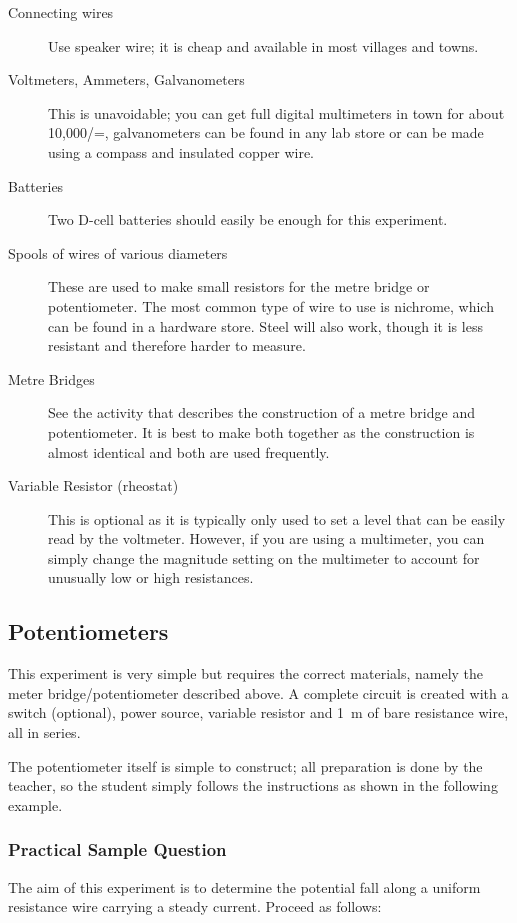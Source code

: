 \begin{description}
\item[Connecting wires]{Use speaker wire; it is cheap and available in most villages
and towns.}
\item[Voltmeters, Ammeters, Galvanometers]{This is unavoidable; you can get full
digital multimeters in town for about 10,000/=, galvanometers can be found in
any lab store or can be made using a compass and insulated copper wire.}
\item[Batteries]{Two D-cell batteries should easily be enough for this experiment.}
\item[Spools of wires of various diameters]{These are used to make small resistors for
the metre bridge or potentiometer. The most common type of wire to use is
nichrome, which can be found in a hardware store. Steel will also work, though it
is less resistant and therefore harder to measure.}
\item[Metre Bridges]{See the activity that describes the construction of a metre bridge
and potentiometer. It is best to make both together as the construction is almost
identical and both are used frequently.}
\item[Variable Resistor (rheostat)]{This is optional as it is typically only used to set a
level that can be easily read by the voltmeter. However, if you are using a
multimeter, you can simply change the magnitude setting on the multimeter to
account for unusually low or high resistances.}
\end{description}

\subsection{Potentiometers}

This experiment is very simple but requires the correct materials, namely the
meter bridge/potentiometer described above. A complete circuit is created with a switch
(optional), power source, variable resistor and 1~m of bare resistance wire, all in series.

The potentiometer itself is simple to construct; all preparation is done by the teacher, so
the student simply follows the instructions as shown in the following example.

\subsubsection{Practical Sample Question}

The aim of this experiment is to determine the potential fall along a uniform
resistance wire carrying a steady current. Proceed as follows:


